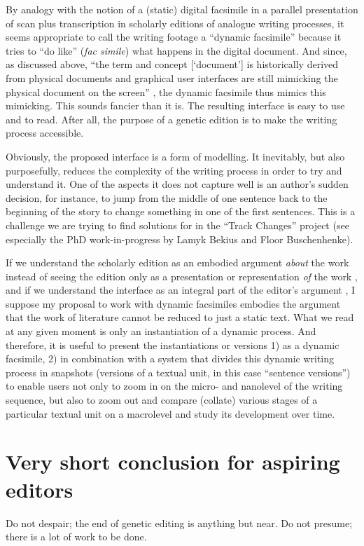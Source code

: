\begin{paper}
\noindent By analogy with the notion of a (static) digital facsimile in a parallel
presentation of scan plus transcription in scholarly editions of
analogue writing processes, it seems appropriate to call the writing
footage a ``dynamic facsimile'' because it tries to ``do like'' (\emph{fac simile})
what happens in the digital document. And since, as discussed above,
``the term and concept {[}`document'{]} is historically derived from
physical documents and graphical user interfaces are still mimicking the
physical document on the screen'' \citep[397]{ries_rationale_2018}, the dynamic
facsimile thus mimics this mimicking. This sounds fancier than it is.
The resulting interface is easy to use and to read. After all, the
purpose of a genetic edition is to make the writing process accessible.

Obviously, the proposed interface is a form of modelling. It inevitably,
but also purposefully, reduces the complexity of the writing process in
order to try and understand it. One of the aspects it does not capture
well is an author's sudden decision, for instance, to jump from the
middle of one sentence back to the beginning of the story to change
something in one of the first sentences. This is a challenge we are
trying to find solutions for in the ``Track Changes'' project (see
especially the PhD work-in-progress by Lamyk Bekius and Floor
Buschenhenke).

If we understand the scholarly edition as an embodied argument
\emph{about} the work instead of seeing the edition only as a
presentation or representation \emph{of} the work \citep{eggert_reader-oriented_2016}, and if
we understand the interface as an integral part of the editor's argument \citep{andrews_what_2018,dillen_editor_2018}, I suppose my proposal to work with
dynamic facsimiles embodies the argument that the work of literature
cannot be reduced to just a static text. What we read at any given
moment is only an instantiation of a dynamic process. And therefore, it
is useful to present the instantiations or versions 1) as a dynamic
facsimile, 2) in combination with a system that divides this dynamic
writing process in snapshots (versions of a textual unit, in this case
``sentence versions'') to enable users not only to zoom in on the micro-
and nanolevel of the writing sequence, but also to zoom out and compare
(collate) various stages of a particular textual unit on a macrolevel
and study its development over time.

\section*{Very short conclusion for aspiring editors}

Do not despair; the end of genetic editing is anything but near. Do not
presume; there is a lot of work to be done.

\begin{flushleft}

\end{flushleft}
\end{paper}